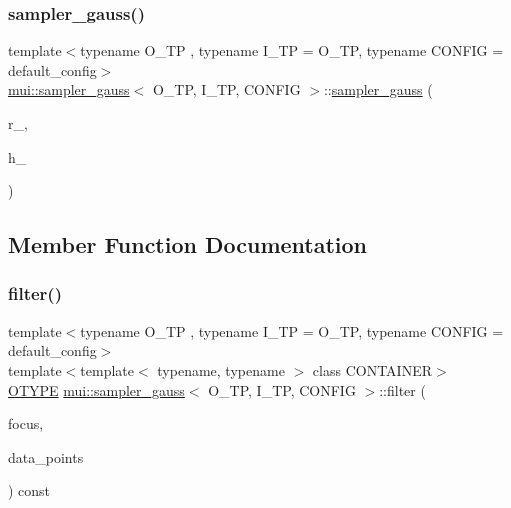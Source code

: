 \subsubsection{\texorpdfstring{sampler\+\_\+gauss()}{sampler\_gauss()}}
{\footnotesize\ttfamily template$<$typename O\+\_\+\+TP , typename I\+\_\+\+TP  = O\+\_\+\+TP, typename C\+O\+N\+F\+IG  = default\+\_\+config$>$ \\
\hyperlink{classmui_1_1sampler__gauss}{mui\+::sampler\+\_\+gauss}$<$ O\+\_\+\+TP, I\+\_\+\+TP, C\+O\+N\+F\+IG $>$\+::\hyperlink{classmui_1_1sampler__gauss}{sampler\+\_\+gauss} (\begin{DoxyParamCaption}\item[{\hyperlink{classmui_1_1sampler__gauss_a35a01ac5eb1f9f41dc5642844a43366b}{R\+E\+AL}}]{r\+\_\+,  }\item[{\hyperlink{classmui_1_1sampler__gauss_a35a01ac5eb1f9f41dc5642844a43366b}{R\+E\+AL}}]{h\+\_\+ }\end{DoxyParamCaption})\hspace{0.3cm}{\ttfamily [inline]}}



\subsection{Member Function Documentation}
\mbox{\label{classmui_1_1sampler__gauss_a70aa5b27c0d7696ad23b1cb024000caa}} 
\subsubsection{\texorpdfstring{filter()}{filter()}}
{\footnotesize\ttfamily template$<$typename O\+\_\+\+TP , typename I\+\_\+\+TP  = O\+\_\+\+TP, typename C\+O\+N\+F\+IG  = default\+\_\+config$>$ \\
template$<$template$<$ typename, typename $>$ class C\+O\+N\+T\+A\+I\+N\+ER$>$ \\
\hyperlink{classmui_1_1sampler__gauss_a315bd10f3854b5411bcb50c6250736e8}{O\+T\+Y\+PE} \hyperlink{classmui_1_1sampler__gauss}{mui\+::sampler\+\_\+gauss}$<$ O\+\_\+\+TP, I\+\_\+\+TP, C\+O\+N\+F\+IG $>$\+::filter (\begin{DoxyParamCaption}\item[{\hyperlink{classmui_1_1sampler__gauss_aeae4228a569ecea463221e54dade2bcc}{point\+\_\+type}}]{focus,  }\item[{const C\+O\+N\+T\+A\+I\+N\+ER$<$ \hyperlink{classmui_1_1sampler__gauss_a3d12840af96d1e49b37ca6ceec0005e6}{I\+T\+Y\+PE}, C\+O\+N\+F\+IG $>$ \&}]{data\+\_\+points }\end{DoxyParamCaption}) const\hspace{0.3cm}{\ttfamily [inline]}}

